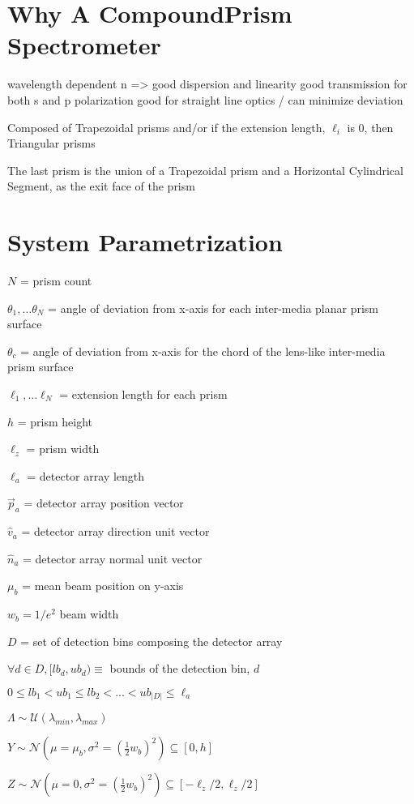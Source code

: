 \documentclass{article}
\begin{document}
\section{Why A CompoundPrism Spectrometer}\label{sec:why-a-compoundprism-spectrometer}
wavelength dependent n => good dispersion and linearity
good transmission for both s and p polarization
good for straight line optics / can minimize deviation

Composed of Trapezoidal prisms and/or if the extension length, ${\ell_i }$ is 0, then Triangular prisms

The last prism is the union of a Trapezoidal prism and a Horizontal Cylindrical Segment, as the exit
face of the prism

\section{System Parametrization}\label{sec:system-parametrization}
$N$ = prism count

${\theta_1, \dots \theta_N }$ =  angle of deviation from x-axis for each inter-media planar prism surface

$\theta_c$ =  angle of deviation from x-axis for the chord of the lens-like inter-media prism surface

${\ell_1, \dots \ell_N }$ = extension length for each prism

$h$ = prism height

$\ell_z$  = prism width

$\ell_a$  = detector array length

$\vec{p}_a$ = detector array position vector

$\hat{v}_a$ = detector array direction unit vector

$\hat{n}_a$ = detector array normal unit vector

$\mu_b$ = mean beam position on y-axis

$w_b = 1 / e^2$ {beam width}

$D$ = set of detection bins composing the detector array

$\forall d \in D, [lb_d, ub_d) \equiv$ bounds of the detection bin, $d$

$0 \leq lb_1 < ub_1 \leq lb_2 < ... < ub_{|D|} \leq \ell_a $

$\Lambda \sim \mathcal{U}(\lambda_{min}, \lambda_{max}) $

$Y \sim \mathcal {N}(\mu=\mu_b, \sigma^2=(\frac{1}{2}w_b)^2) \subseteq [0, h] $

$Z \sim \mathcal {N}(\mu=0, \sigma^2=(\frac{1}{2}w_b)^2) \subseteq [-\ell_z / 2, \ell_z / 2]$
\end{document}
